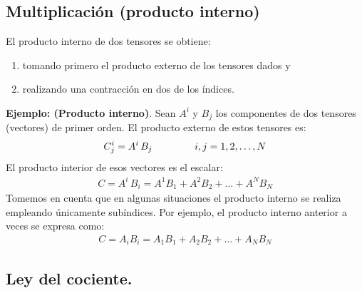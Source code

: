 \documentclass[hidelinks,12pt]{article}
\begin{document}
\subsection{Multiplicación (producto interno)}

El producto interno de dos tensores se obtiene:
\begin{enumerate}[label=\roman*)]
\item tomando primero el producto externo de los tensores dados y
\item realizando una contracción en dos de los índices.
\end{enumerate}

\noindent
\textbf{Ejemplo: (Producto interno)}. Sean $A^{i}$ y $B_{j}$ los componentes de dos tensores (vectores) de primer orden. El producto externo de estos tensores es:
\begin{align*}
C_{j}^{i} = A^{i} \, B_{j} \hspace{1.5cm} i, j = 1, 2, \ldots, N
\end{align*}
El producto interior de esos vectores es el escalar:
\begin{align*}
C = A^{i} \, B_{i} = A^{1} B_{1} + A^{2} B_{2} + \ldots + A^{N} B_{N}
\end{align*}
Tomemos en cuenta que en algunas situaciones el producto interno se realiza empleando únicamente subíndices. Por ejemplo, el producto interno anterior a veces se expresa como:
\begin{align*}
C = A_{i} B_{i} = A_{1} B_{1} + A_{2} B_{2} + \ldots + A_{N} B_{N}
\end{align*}

\subsection{Ley del cociente.}
\end{document}
